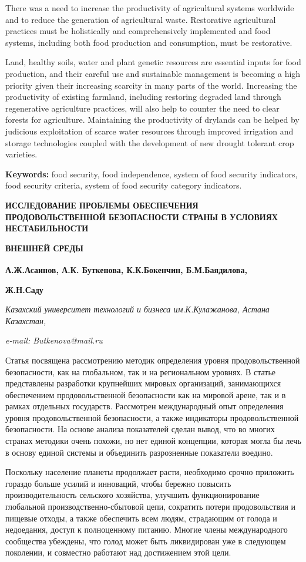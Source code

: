 {There was a need to increase the productivity of agricultural systems
worldwide and to reduce the generation of agricultural waste.
Restorative agricultural practices must be holistically and
comprehensively implemented and food systems, including both food
production and consumption, must be restorative.

Land, healthy soils, water and plant genetic resources are essential
inputs for food production, and their careful use and sustainable
management is becoming a high priority given their increasing scarcity
in many parts of the world. Increasing the productivity of existing
farmland, including restoring degraded land through regenerative
agriculture practices, will also help to counter the need to clear
forests for agriculture. Maintaining the productivity of drylands can be
helped by judicious exploitation of scarce water resources through
improved irrigation and storage technologies coupled with the
development of new drought tolerant crop varieties.

{\bfseries Keywords:} food security, food independence, system of food
security indicators, food security criteria, system of food security
category indicators.

{\bfseries ИССЛЕДОВАНИЕ ПРОБЛЕМЫ ОБЕСПЕЧЕНИЯ ПРОДОВОЛЬСТВЕННОЙ БЕЗОПАСНОСТИ
СТРАНЫ В УСЛОВИЯХ НЕСТАБИЛЬНОСТИ}

{\bfseries ВНЕШНЕЙ СРЕДЫ}

{\bfseries А.Ж.Асаинов, А.К. Буткенова\textsuperscript{\envelope }, К.К.Бокенчин,
Б.М.Баядилова,}

{\bfseries Ж.Н.Саду}

\emph{Казахский университет технологий и бизнеса им.К.Кулажанова, Астана
Казахстан,}

\emph{e-mail: Butkenova@mail.ru}

Статья посвящена рассмотрению методик определения уровня
продовольственной безопасности, как на глобальном, так и на региональном
уровнях. В статье представлены разработки крупнейших мировых
организаций, занимающихся обеспечением продовольственной безопасности
как на мировой арене, так и в рамках отдельных государств. Рассмотрен
международный опыт определения уровня продовольственной безопасности, а
также индикаторы продовольственной безопасности. На основе анализа
показателей сделан вывод, что во многих странах методики очень похожи,
но нет единой концепции, которая могла бы лечь в основу единой системы и
объединить разрозненные показатели воедино.

Поскольку население планеты продолжает расти, необходимо срочно
приложить гораздо больше усилий и инноваций, чтобы бережно повысить
производительность сельского хозяйства, улучшить функционирование
глобальной производственно-сбытовой цепи, сократить потери
продовольствия и пищевые отходы, а также обеспечить всем людям,
страдающим от голода и недоедания, доступ к полноценному питанию. Многие
члены международного сообщества убеждены, что голод может быть
ликвидирован уже в следующем поколении, и совместно работают над
достижением этой цели.

}
